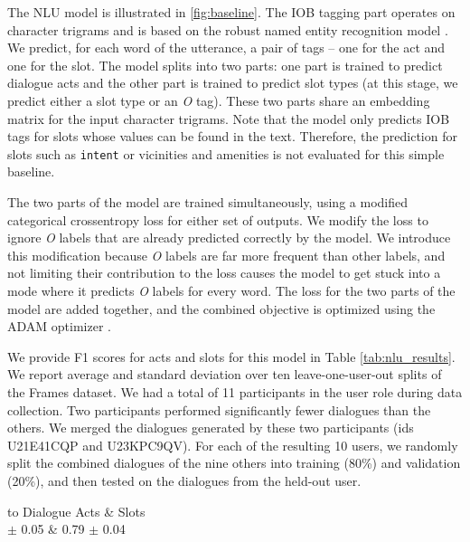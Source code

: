 \documentclass{article}
\theoremstyle{definition}
\begin{document}
The NLU model is illustrated in \cref{fig:baseline}. The IOB tagging part operates on character trigrams and is based on the robust named entity recognition model \citep{Arnold:16}. We predict, for each word of the utterance, a pair of tags -- one for the act and one for the slot. The model splits into two parts: one part is trained to predict dialogue acts and 
the other part is trained to predict slot types (at this stage, we predict either a slot type or an \emph{O} tag). These two parts share an embedding matrix for the input character trigrams. Note that the model only predicts IOB tags for slots whose values can be found in the text. Therefore, the prediction for slots such as \texttt{intent} or vicinities and amenities is not evaluated for this simple baseline.

The two parts of the model are trained simultaneously, using a modified categorical crossentropy loss for either set of outputs. We modify the loss to ignore \emph{O} labels that are already predicted correctly by the model. We introduce this modification because \emph{O} labels are far more frequent than other labels, and not limiting their contribution to the loss causes the model to get stuck into a mode where it predicts \emph{O} labels for every word. The loss for the two parts of the model are added together, and the combined objective is optimized using the ADAM optimizer \citep{Kingma:14}. 

We provide F1 scores for acts and slots for this model in Table \ref{tab:nlu_results}. We report average and standard deviation over ten leave-one-user-out splits of the Frames dataset. We had a total of 11 participants in the user role during data collection. Two participants performed significantly fewer dialogues than the others. We merged the dialogues generated by these two participants (ids U21E41CQP and U23KPC9QV). For each of the resulting 10 users, we randomly split the combined dialogues of the nine others into training (80\%) and validation (20\%), and then tested on the dialogues from the held-out user.

\begin{table}
\begin{center}
\caption{F1 scores for the NLU baseline (mean and standard deviation).}
\begin{tabu}to
\toprule
                   {Dialogue Acts} & {Slots}\\ $\pm$ 0.05 & 0.79 $\pm$ 0.04 \\
\bottomrule
\end{tabu}
\label{tab:nlu_results}
\end{center}
\end{table}
\end{document}
